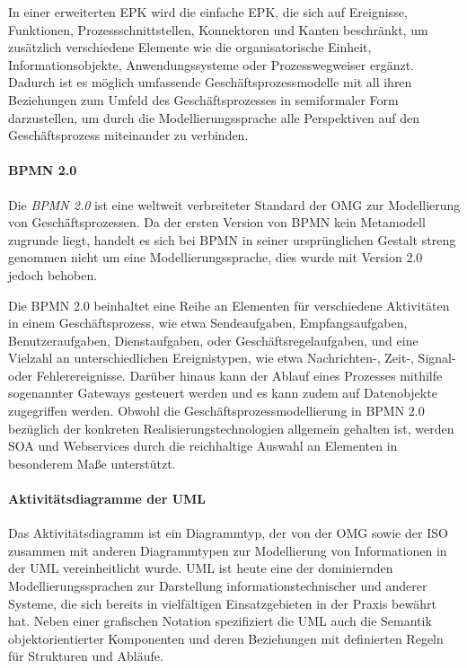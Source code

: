 In einer erweiterten \ac{EPK} wird die einfache \ac{EPK}, die sich auf Ereignisse, Funktionen, Prozessschnittstellen, Konnektoren und Kanten beschränkt, um zusätzlich verschiedene Elemente wie die organisatorische Einheit, Informationsobjekte, Anwendungssysteme oder Prozesswegweiser ergänzt. 
\cite{Seidlmeier.2015}
Dadurch ist es möglich umfassende Geschäftsprozessmodelle mit all ihren Beziehungen zum Umfeld des Geschäftsprozesses in semiformaler Form darzustellen, um durch die Modellierungssprache alle Perspektiven auf den Geschäftsprozess miteinander zu verbinden.
\cite{Gadatsch.2013}

\paragraph{\acl{BPMN} 2.0}
Die \textit{\acf{BPMN} 2.0} ist eine weltweit verbreiteter Standard der \ac{OMG} zur Modellierung von Geschäftsprozessen.
Da der ersten Version von \ac{BPMN} kein Metamodell zugrunde liegt, handelt es sich bei \ac{BPMN} in seiner ursprünglichen Gestalt streng genommen nicht um eine Modellierungssprache, dies wurde  mit Version 2.0 jedoch behoben. 
\cite{OMG.2014}

Die \ac{BPMN} 2.0 beinhaltet eine Reihe an Elementen für verschiedene Aktivitäten in einem Geschäftsprozess, wie etwa Sendeaufgaben, Empfangsaufgaben, Benutzeraufgaben, Dienstaufgaben, oder Geschäftsregelaufgaben, und eine Vielzahl an unterschiedlichen Ereignistypen, wie etwa Nachrichten-, Zeit-, Signal- oder Fehlerereignisse. 
Darüber hinaus kann der Ablauf eines Prozesses mithilfe sogenannter Gateways gesteuert werden und es kann zudem auf Datenobjekte zugegriffen werden. 
\cite{Weidlich.2010}
Obwohl die Geschäftsprozessmodellierung in \ac{BPMN} 2.0 bezüglich der konkreten Realisierungstechnologien allgemein gehalten ist, werden \ac{SOA} und Webservices durch die reichhaltige Auswahl an Elementen in besonderem Maße unterstützt.
\cite{Jobst.2010}

\paragraph{Aktivitätsdiagramme der \acl{UML}}
Das Aktivitätsdiagramm ist ein Diagrammtyp, der von der \ac{OMG} sowie der \ac{ISO} zusammen mit anderen Diagrammtypen zur Modellierung von Informationen in der \acf{UML} vereinheitlicht wurde.
\cite{OMG.2014}\cite{ISO.2012}
\ac{UML} ist heute eine der dominiernden Modellierungssprachen zur Darstellung informationstechnischer und anderer Systeme, die sich bereits in vielfältigen Einsatzgebieten in der Praxis bewährt hat.
Neben einer grafischen Notation spezifiziert die \ac{UML} auch die Semantik objektorientierter Komponenten und deren Beziehungen mit definierten Regeln für Strukturen und Abläufe.
\cite{Rumpe.2011}

